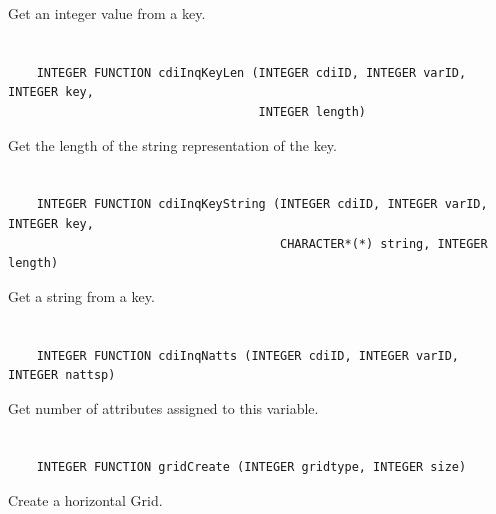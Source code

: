 Get an integer value from a key.


\section*{\tt {}}

\begin{verbatim}
    INTEGER FUNCTION cdiInqKeyLen (INTEGER cdiID, INTEGER varID, INTEGER key,
                                   INTEGER length)
\end{verbatim}

Get the length of the string representation of the key.


\section*{\tt {}}

\begin{verbatim}
    INTEGER FUNCTION cdiInqKeyString (INTEGER cdiID, INTEGER varID, INTEGER key,
                                      CHARACTER*(*) string, INTEGER length)
\end{verbatim}

Get a string from a key.


\section*{\tt {}}

\begin{verbatim}
    INTEGER FUNCTION cdiInqNatts (INTEGER cdiID, INTEGER varID, INTEGER nattsp)
\end{verbatim}

Get number of attributes assigned to this variable.


\section*{\tt {}}

\begin{verbatim}
    INTEGER FUNCTION gridCreate (INTEGER gridtype, INTEGER size)
\end{verbatim}

Create a horizontal Grid.


\section*{\tt {}}

